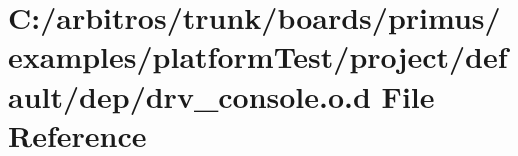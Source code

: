 \hypertarget{platform_test_2project_2default_2dep_2drv__console_8o_8d}{\section{C\-:/arbitros/trunk/boards/primus/examples/platform\-Test/project/default/dep/drv\-\_\-console.o.\-d File Reference}
\label{platform_test_2project_2default_2dep_2drv__console_8o_8d}
}
